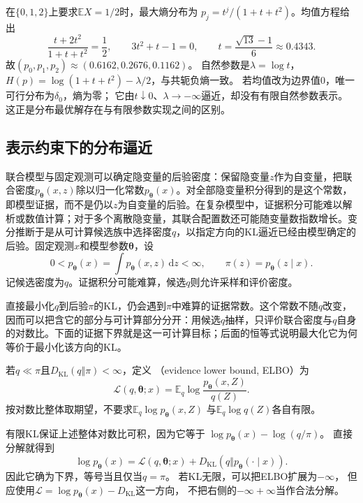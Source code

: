在\(\{0,1,2\}\)上要求\(\mathbb EX=1/2\)时，最大熵分布为
\(p_j=t^j/(1+t+t^2)\)。均值方程给出
\[
  \frac{t+2t^2}{1+t+t^2}=\frac12,\qquad
  3t^2+t-1=0,\qquad
  t=\frac{\sqrt{13}-1}{6}\approx0.4343.
\]
故\((p_0,p_1,p_2)\approx(0.6162,0.2676,0.1162)\)。
自然参数是\(\lambda=\log t\)，
\(H(p)=\log(1+t+t^2)-\lambda/2\)，与共轭负熵一致。
若均值改为边界值\(0\)，唯一可行分布为\(\delta_0\)，熵为零；
它由\(t\downarrow0\)、\(\lambda\to-\infty\)逼近，却没有有限自然参数表示。
这正是分布最优解存在与有限参数实现之间的区别。

\subsection{表示约束下的分布逼近}
\label{sec:information-elbo-approximation}

联合模型与固定观测可以确定隐变量的后验密度：保留隐变量\(z\)作为自变量，把联合密度\(p_{\bm\theta}(x,z)\)除以归一化常数\(p_{\bm\theta}(x)\)。对全部隐变量积分得到的是这个常数，即模型证据，而不是仍以\(z\)为自变量的后验。在复杂模型中，证据积分可能难以解析或数值计算；对于多个离散隐变量，其联合配置数还可能随变量数指数增长。变分推断于是从可计算候选族中选择密度\(q\)，以指定方向的KL逼近已经由模型确定的后验。固定观测\(x\)和模型参数\(\bm\theta\)，设
\[
  0<p_{\bm\theta}(x)=\int p_{\bm\theta}(x,z)\,\mathrm dz<\infty,
  \qquad
  \pi(z)=p_{\bm\theta}(z\mid x).
\]
记候选密度为\(q\)。证据积分可能难算，候选\(q\)则允许采样和评价密度。

直接最小化\(q\)到后验\(\pi\)的KL，仍会遇到\(\pi\)中难算的证据常数。这个常数不随\(q\)改变，因而可以把含它的部分与可计算部分分开：用候选\(q\)抽样，只评价联合密度与\(q\)自身的对数比。下面的证据下界就是这一可计算目标；后面的恒等式说明最大化它为何等价于最小化该方向的KL。
\begin{definition}[证据下界]
\label{def:information-elbo}
若\(q\ll\pi\)且\(D_{\mathrm{KL}}(q\Vert\pi)<\infty\)，定义
（evidence lower bound, ELBO）为
\[
  \mathcal L(q,\bm\theta;x)
  =\mathbb E_q\log\frac{p_{\bm\theta}(x,Z)}{q(Z)}.
\]
按对数比整体取期望，不要求\(\mathbb E_q\log p_{\bm\theta}(x,Z)\)
与\(\mathbb E_q\log q(Z)\)各自有限。
\end{definition}

有限KL保证上述整体对数比可积，因为它等于
\(\log p_{\bm\theta}(x)-\log(q/\pi)\)。
直接分解就得到
\begin{equation}
  \log p_{\bm\theta}(x)
  =\mathcal L(q,\bm\theta;x)+D_{\mathrm{KL}}(q\Vert p_{\bm\theta}(\cdot\mid x)).
  \label{eq:information-elbo-decomposition}
\end{equation}
因此它确为下界，等号当且仅当\(q=\pi\)。
若KL无限，可以把ELBO扩展为\(-\infty\)，
但应使用\(\mathcal L=\log p_{\bm\theta}(x)-D_{\mathrm{KL}}\)这一方向，
不把右侧的\(-\infty+\infty\)当作合法分解。

